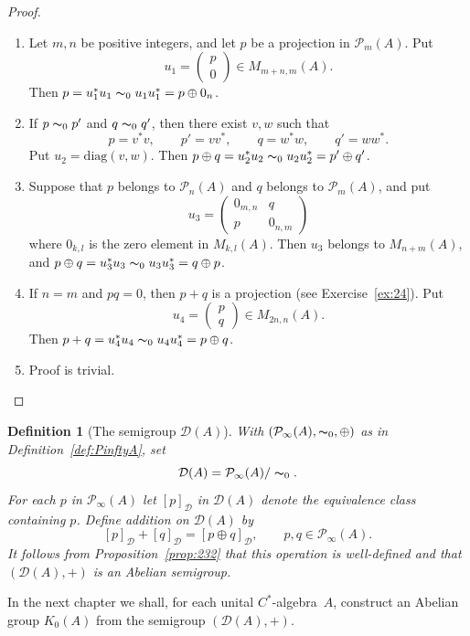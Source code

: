 \documentclass{book}
\newtheorem{definition}{Definition}[section]
\def\cstar{\(C^*\)-algebra}
\begin{document}
\begin{proof}
  \begin{enumerate}
    \item Let \(m, n\) be positive integers, and let \(p\) be a projection in \(\mathcal{P}_m(A)\).
      Put
      \[
        u_1=\begin{pmatrix}
          p\\0
        \end{pmatrix}\in M_{m+n,m}(A).
      \]
      Then \(p=u^*_1 u_1\thicksim_0 u_1 u_1^*=p\oplus 0_n\).
    \item If \(p\thicksim_0 p'\) and \(q\thicksim_0 q'\), then there exist \(v, w\) such that 
    \[
      p=v^*v,\qquad p'=vv^*,\qquad q=w^*w,\qquad q'=ww^*.
    \]
    Put \(u_2 =\text{diag}(v, w)\). Then \(p\oplus q=u_2^*u_2\thicksim_0 u_2u_2^*=p'\oplus q'\).
    \item Suppose that \(p\) belongs to \(\mathcal{P}_n(A)\) and \(q\) belongs to \(\mathcal{P}_m(A)\), and put
    \[
      u_3=\begin{pmatrix}
        0_{m,n}&q\\p&0_{n,m}
      \end{pmatrix}
    \]
    where \(0_{k,l}\) is the zero element in \(M_{k,l}(A)\). Then \(u_3\) belongs to \(M_{n+m}(A)\),
    and \(p\oplus q=u^*_3u_3\thicksim_0 u_3u^*_3=q\oplus p\).
    \item If \(n=m\) and \(pq=0\), then \(p+q\) is a projection (see Exercise~\ref{ex:24}).
    Put 
    \[
      u_4=\begin{pmatrix}
        p\\q
      \end{pmatrix}\in M_{2n,n}(A).
    \]
    Then \(p+q=u_4^*u_4\thicksim_0 u_4u^*_4=p\oplus q\).
    \item Proof is trivial.
  \end{enumerate}
\end{proof}
\begin{definition}[The semigroup \(\mathcal{D}(A)\)]
  With \((\mathcal{P}_\infty(A), \thicksim_0, \oplus)\) as in Definition~\ref{def:PinftyA}, set
  \[
    \mathcal{D}(A) = \mathcal{P}_\infty(A)/\thicksim_0.
  \]
  For each \(p\) in \(\mathcal{P}_\infty(A)\) let \({[p]}_\mathcal{D}\) in \(\mathcal{D}(A)\) denote the 
  equivalence class containing \(p\). Define addition on \(\mathcal{D}(A)\) by
  \[
    {[p]}_\mathcal{D}+{[q]}_\mathcal{D}={[p\oplus q]}_\mathcal{D},\qquad p,q\in\mathcal{P}_\infty (A).
  \]
  It follows from Proposition~\ref{prop:232} that this operation is well-defined and that \((\mathcal{D}(A),+)\) is an Abelian semigroup.
\end{definition}
In the next chapter we shall, for each unital \cstar\ \(A\), construct an Abelian group \(K_0(A)\) from the semigroup \((\mathcal{D}(A),+)\).
\end{document}
